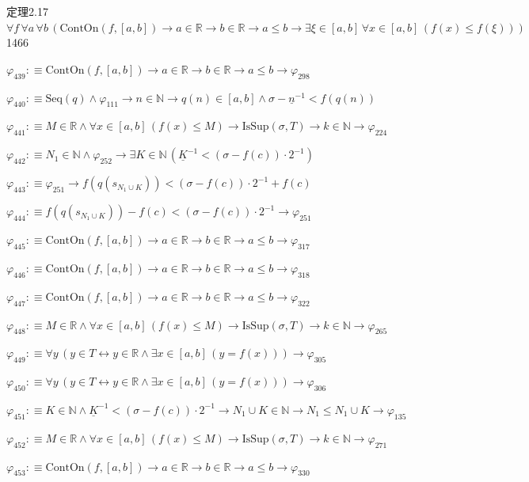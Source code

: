 \begin{fullproof}{定理2.17}{$\forall f\,\forall a\,\forall b\,(\mathrm{ContOn}(f,[a,b]) \to a \in \mathbb{R} \to b \in \mathbb{R} \to a \leq b \to \exists \xi \in [a,b]\,\forall x \in [a,b]\,(f(x) \leq f(\xi)))$}{1466}
\begin{abbrevlist}
\item $\varphi_{439} :\equiv \mathrm{ContOn}(f,[a,b]) \to a \in \mathbb{R} \to b \in \mathbb{R} \to a \leq b \to \varphi_{298}$
\item $\varphi_{440} :\equiv \mathrm{Seq}(q) \land \varphi_{111} \to n \in \mathbb{N} \to q(n) \in [a,b] \land \sigma - \underline{n}^{-1} < f(q(n))$
\item $\varphi_{441} :\equiv M \in \mathbb{R} \land \forall x \in [a,b]\,(f(x) \leq M) \to \mathrm{IsSup}(\sigma,T) \to k \in \mathbb{N} \to \varphi_{224}$
\item $\varphi_{442} :\equiv N_{1} \in \mathbb{N} \land \varphi_{252} \to \exists K \in \mathbb{N}\,(\underline{K}^{-1} < (\sigma - f(c)) \cdot 2^{-1})$
\item $\varphi_{443} :\equiv \varphi_{251} \to f(q(s_{N_{1} \cup K})) < (\sigma - f(c)) \cdot 2^{-1} + f(c)$
\item $\varphi_{444} :\equiv f(q(s_{N_{1} \cup K})) - f(c) < (\sigma - f(c)) \cdot 2^{-1} \to \varphi_{251}$
\item $\varphi_{445} :\equiv \mathrm{ContOn}(f,[a,b]) \to a \in \mathbb{R} \to b \in \mathbb{R} \to a \leq b \to \varphi_{317}$
\item $\varphi_{446} :\equiv \mathrm{ContOn}(f,[a,b]) \to a \in \mathbb{R} \to b \in \mathbb{R} \to a \leq b \to \varphi_{318}$
\item $\varphi_{447} :\equiv \mathrm{ContOn}(f,[a,b]) \to a \in \mathbb{R} \to b \in \mathbb{R} \to a \leq b \to \varphi_{322}$
\item $\varphi_{448} :\equiv M \in \mathbb{R} \land \forall x \in [a,b]\,(f(x) \leq M) \to \mathrm{IsSup}(\sigma,T) \to k \in \mathbb{N} \to \varphi_{265}$
\item $\varphi_{449} :\equiv \forall y\,(y \in T \leftrightarrow y \in \mathbb{R} \land \exists x \in [a,b]\,(y = f(x))) \to \varphi_{305}$
\item $\varphi_{450} :\equiv \forall y\,(y \in T \leftrightarrow y \in \mathbb{R} \land \exists x \in [a,b]\,(y = f(x))) \to \varphi_{306}$
\item $\varphi_{451} :\equiv K \in \mathbb{N} \land \underline{K}^{-1} < (\sigma - f(c)) \cdot 2^{-1} \to N_{1} \cup K \in \mathbb{N} \to N_{1} \leq N_{1} \cup K \to \varphi_{135}$
\item $\varphi_{452} :\equiv M \in \mathbb{R} \land \forall x \in [a,b]\,(f(x) \leq M) \to \mathrm{IsSup}(\sigma,T) \to k \in \mathbb{N} \to \varphi_{271}$
\item $\varphi_{453} :\equiv \mathrm{ContOn}(f,[a,b]) \to a \in \mathbb{R} \to b \in \mathbb{R} \to a \leq b \to \varphi_{330}$

\end{abbrevlist}
\end{fullproof}

